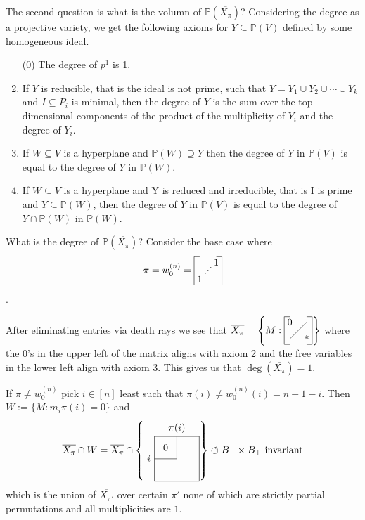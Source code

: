 \documentclass[12pt]{amsart}
\numberwithin{equation}{section}
\theoremstyle{definition}
\numberwithin{figure}{section}
\renewcommand{\P}{\mathbb{P}}
\begin{document}
The second question is what is the volumn of $\P(\overline{X_\pi})$?
Considering the degree as a projective variety, we get the following axioms for $Y\subseteq\P(V)$ defined by some homogeneous ideal.
\begin{enumerate}
\item[(0)] The degree of $p^1$ is 1.
\item If $Y$ is reducible, that is the ideal is not prime, such that $Y=Y_1\cup Y_2\cup\cdots\cup Y_k$ and $I\subseteq P_i$ is minimal, then the degree of $Y$ is the sum over the top dimensional components of the product of the multiplicity of $Y_i$ and the degree of $Y_i$.
\item If $W\subseteq V$ is a hyperplane and $\P(W)\supseteq Y$ then the degree of $Y$ in $\P(V)$ is equal to the degree of $Y$ in $\P(W)$.
\item If $W\subseteq V$ is a hyperplane and Y is reduced and irreducible, that is I is prime and $Y\subseteq \P(W)$, then the degree of $Y$ in $\P(V)$ is equal to the degree of $Y\cap\P(W)$ in $\P(W)$.

\end{enumerate}

What is the degree of $\P(\overline{X_\pi})$? Consider the base case where $$\pi=w_0^{(n)}=
\vcenter{\hbox{\begin{tikzpicture}
\node at (.2,.2) {1};
\node at (.8,.8) {1};
\node at (.4,.4) {$\cdot$};
\node at (.5,.5) {$\cdot$};
\node at (.6,.6) {$\cdot$};
\draw[-] (0,0) to (0,1);
\draw[-] (0,0) to (.2,0);
\draw[-] (0,1) to (.2,1);
\draw[-] (1,0) to (1,1);
\draw[-] (.8,0) to (1,0);
\draw [-] (.8,1) to (1,1);
\end{tikzpicture}}}$$.

After eliminating entries via death rays we see that
$\overline{X_\pi}=\left \{ M: \vcenter{\hbox{\begin{tikzpicture}
\node at (.2,.8) {0};
\node at (.8,.2) {*};
\draw[-] (.2,.2) to (.8,.8);
\draw[-] (0,0) to (0,1);
\draw[-] (0,0) to (.2,0);
\draw[-] (0,1) to (.2,1);
\draw[-] (1,0) to (1,1);
\draw[-] (.8,0) to (1,0);
\draw [-] (.8,1) to (1,1);
\end{tikzpicture}}}\right \}$
where the $0$'s in the upper left of the matrix aligns with axiom 2 and the free variables in the lower left align with axiom 3. This gives us that $\deg(\overline{X_\pi})=1$.

If $\pi\neq w_0^{(n)}$ pick $i\in[n]$ least such that $\pi(i)\neq w_0^{(n)}(i)=n+1-i$. Then $W:=\{ M: m_i\pi(i)=0\}$ and $$\overline{X_\pi}\cap W=\overline{X_\pi}\cap\left\{ \vcenter{\hbox{\begin{tikzpicture}
\node at (0,0) {$i$};
\node at (1,1.1) {$\pi(i)$};
\node at (.6,.4) {$0$};
\draw[-] (.2,.8) to (.2,-.8);
\draw[-] (.2,-.8) to (1.8,-.8);
\draw[-] (1.8,-.8) to (1.8,.8);
\draw[-] (1.8,.8)to (.2,.8);
\draw[-] (1,0) to (1,.8);
\draw[-] (.2,0) to (1,0);
\end{tikzpicture}}}\right\}\circlearrowleft B_-\times B_+ \text{ invariant}$$ which is the union of $\overline{X_{\pi'}}$ over certain $\pi'$ none of which are strictly partial permutations and all multiplicities are $1$.
\end{document}
